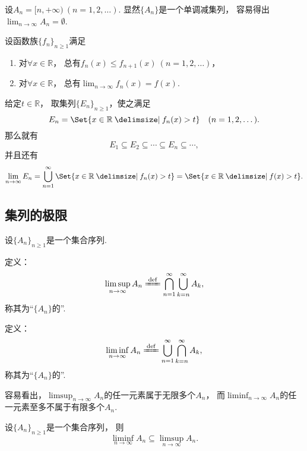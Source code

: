 \begin{example}
设\(A_n = [n,+\infty)\ (n=1,2,\dotsc)\).
显然\(\{A_n\}\)是一个单调减集列，
容易得出\(\lim_{n\to\infty} A_n = \emptyset\).
\end{example}

\begin{example}
设函数族\(\{f_n\}_{n\geq1}\)满足
\begin{enumerate}
	\item 对\(\forall x\in\mathbb{R}\)，
	总有\(f_n(x) \leq f_{n+1}(x)\ (n=1,2,\dotsc)\)，
	\item 对\(\forall x\in\mathbb{R}\)，
	总有\(\lim_{n\to\infty} f_n(x) = f(x)\).
\end{enumerate}
给定\(t\in\mathbb{R}\)，
取集列\(\{E_n\}_{n\geq1}\)，使之满足\[
	E_n = \Set{ x\in\mathbb{R} \given f_n(x) > t }
	\quad(n=1,2,\dotsc).
\]
那么就有\[
	E_1 \subseteq E_2 \subseteq \dotsb \subseteq E_n \subseteq \dotsb,
\]
并且还有\[
	\lim_{n\to\infty} E_n
	= \bigcup_{n=1}^\infty \Set{ x\in\mathbb{R} \given f_n(x) > t }
	= \Set{ x\in\mathbb{R} \given f(x) > t }.
\]
\end{example}

\subsection{集列的极限}
\begin{definition}
设\(\{A_n\}_{n\geq1}\)是一个集合序列.

定义：\[
	\limsup_{n\to\infty} A_n
	\defeq
	\bigcap_{n=1}^\infty
	\bigcup_{k=n}^\infty
	A_k,
\]
称其为“\(\{A_n\}\)的”.

定义：\[
	\liminf_{n\to\infty} A_n
	\defeq
	\bigcup_{n=1}^\infty
	\bigcap_{k=n}^\infty
	A_k,
\]
称其为“\(\{A_n\}\)的”.
\end{definition}
容易看出，\(\limsup_{n\to\infty} A_n\)的任一元素属于无限多个\(A_n\)，
而\(\liminf_{n\to\infty} A_n\)的任一元素至多不属于有限多个\(A_n\).

\begin{proposition}
设\(\{A_n\}_{n\geq1}\)是一个集合序列，
则\begin{equation}
	\liminf_{n\to\infty} A_n
	\subseteq
	\limsup_{n\to\infty} A_n.
\end{equation}
\end{proposition}

